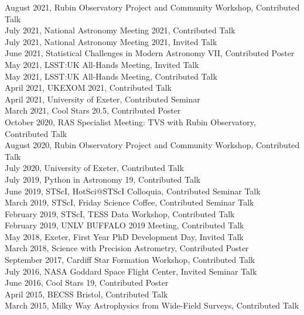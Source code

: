 \documentclass[letter, margin, 10pt]{res} %
\begin{document}
\begin{resume}
\vspace{-4pt}
August 2021, Rubin Observatory Project and Community Workshop, Contributed Talk\\
July 2021, National Astronomy Meeting 2021, Contributed Talk\\
July 2021, National Astronomy Meeting 2021, Invited Talk\\
June 2021, Statistical Challenges in Modern Astronomy VII, Contributed Poster\\
May 2021, LSST:UK All-Hands Meeting, Invited Talk\\
May 2021, LSST:UK All-Hands Meeting, Contributed Talk\\
April 2021, UKEXOM 2021, Contributed Talk\\
April 2021, University of Exeter, Contributed Seminar\\
March 2021, Cool Stars 20.5, Contributed Poster\\
October 2020, RAS Specialist Meeting: TVS with Rubin Observatory, Contributed Talk\\
August 2020, Rubin Observatory Project and Community Workshop, Contributed Talk\\
July 2020, University of Exeter, Contributed Talk\\
July 2019, Python in Astronomy 19, Contributed Talk\\
June 2019, STScI, HotSci@STScI Colloquia, Contributed Seminar Talk\\
March 2019, STScI, Friday Science Coffee, Contributed Seminar Talk\\
February 2019, STScI, TESS Data Workshop, Contributed Talk\\
February 2019, UNLV BUFFALO 2019 Meeting, Contributed Talk\\
May 2018, Exeter, First Year PhD Development Day, Invited Talk\\
March 2018, Science with Precision Astrometry, Contributed Poster\\
September 2017, Cardiff Star Formation Workshop, Contributed Talk\\
July 2016, NASA Goddard Space Flight Center, Invited Seminar Talk\\
June 2016, Cool Stars 19, Contributed Poster\\
April 2015, BECSS Bristol, Contributed Talk\\
March 2015, Milky Way Astrophysics from Wide-Field Surveys, Contributed Talk

 \vspace{-6pt}

\end{resume}
\end{document}
